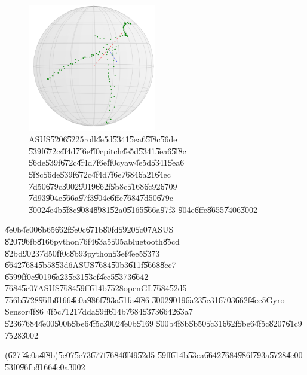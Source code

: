\begin{figure}[th]
\caption{ASUS\U{5206}\U{5225}roll\U{4e5d}\U{5341}\U{5ea6}\U{5f8c}\U{56de}%
\U{539f}\U{672c}\U{4f4d}\U{7f6e}\U{ff0c}pitch\U{4e5d}\U{5341}\U{5ea6}\U{5f8c}%
\U{56de}\U{539f}\U{672c}\U{4f4d}\U{7f6e}\U{ff0c}yaw\U{4e5d}\U{5341}\U{5ea6}%
\U{5f8c}\U{56de}\U{539f}\U{672c}\U{4f4d}\U{7f6e}\U{7684}\U{6a21}\U{64ec}%
\U{7d50}\U{679c}\U{3002}\U{9019}\U{662f}\U{5b8c}\U{5168}\U{6c92}\U{6709}%
\U{7d93}\U{904e}\U{566a}\U{97f3}\U{904e}\U{6ffe}\U{7684}\U{7d50}\U{679c}%
\U{3002}\U{4e4b}\U{5f8c}\U{9084}\U{8981}\U{52a0}\U{5165}\U{566a}\U{97f3}%
\U{904e}\U{6ffe}\U{8655}\U{7406}\U{3002}}
\begin{center}
\includegraphics[width=0.5\textwidth]{./figs/ASUS_test.png}
\end{center}
\end{figure}

\U{4e0b}\U{4e00}\U{6b65}\U{662f}\U{5e0c}\U{671b}\U{80fd}\U{5920}\U{5c07}ASUS%
\U{8207}\U{96fb}\U{8166}python\U{76f4}\U{63a5}\U{505a}bluetooth\U{85cd}%
\U{82bd}\U{9023}\U{7d50}\U{ff0c}\U{8b93}python\U{53ef}\U{4ee5}\U{5373}%
\U{6642}\U{7684}\U{5b58}\U{53d6}ASUS\U{7684}\U{50b3}\U{611f}\U{5668}\U{8cc7}%
\U{6599}\U{ff0c}\U{9019}\U{6a23}\U{5c31}\U{53ef}\U{4ee5}\U{5373}\U{6642}%
\U{7684}\U{5c07}ASUS\U{7684}\U{59ff}\U{614b}\U{7528}openGL\U{7684}\U{52d5}%
\U{756b}\U{5728}\U{96fb}\U{8166}\U{4e0a}\U{986f}\U{793a}\U{51fa}\U{4f86}%
\U{3002}\U{9019}\U{6a23}\U{5c31}\U{6703}\U{662f}\U{4ee5}Gyro Sensor\U{4f86}%
\U{4f5c}\U{7121}\U{7dda}\U{59ff}\U{614b}\U{7684}\U{5373}\U{6642}\U{63a7}%
\U{5236}\U{7684}\U{4e00}\U{500b}\U{5be6}\U{4f5c}\U{3002}\U{4e0b}\U{5169}%
\U{500b}\U{4f8b}\U{5b50}\U{5c31}\U{662f}\U{5be6}\U{4f5c}\U{8207}\U{61c9}%
\U{7528}\U{3002}

\clearpage%

\begin{case}
(\U{627f}\U{4e0a}\U{4f8b})\U{5c07}\U{5e73}\U{677f}\U{7684}\U{8f49}\U{52d5}%
\U{59ff}\U{614b}\U{53ca}\U{6642}\U{7684}\U{986f}\U{793a}\U{5728}\U{4e00}%
\U{53f0}\U{96fb}\U{8166}\U{4e0a}\U{3002}
\end{case}

